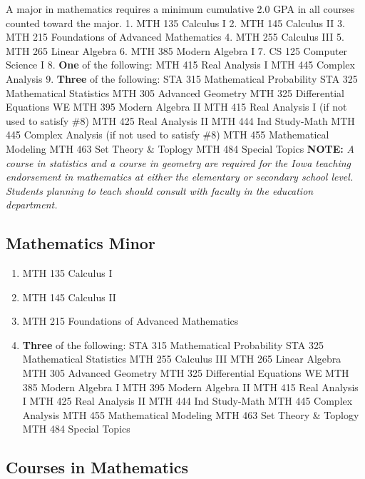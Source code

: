 \documentclass[
  letterpaper,
]{scrbook}
\providecommand{\tightlist}{%
  \setlength{\itemsep}{0pt}\setlength{\parskip}{0pt}}
\begin{document}
A major in mathematics requires a minimum cumulative 2.0 GPA in all
courses counted toward the major. 1. MTH 135 Calculus I 2. MTH 145
Calculus II 3. MTH 215 Foundations of Advanced Mathematics 4. MTH 255
Calculus III 5. MTH 265 Linear Algebra 6. MTH 385 Modern Algebra I 7. CS
125 Computer Science I 8. \textbf{One} of the following: MTH 415 Real
Analysis I MTH 445 Complex Analysis 9. \textbf{Three} of the following:
STA 315 Mathematical Probability STA 325 Mathematical Statistics MTH 305
Advanced Geometry MTH 325 Differential Equations WE MTH 395 Modern
Algebra II MTH 415 Real Analysis I (if not used to satisfy \#8) MTH 425
Real Analysis II MTH 444 Ind Study-Math MTH 445 Complex Analysis (if not
used to satisfy \#8) MTH 455 Mathematical Modeling MTH 463 Set Theory \&
Toplogy MTH 484 Special Topics \textbf{NOTE:} \emph{A course in
statistics and a course in geometry are required for the Iowa teaching
endorsement in mathematics at either the elementary or secondary school
level. Students planning to teach should consult with faculty in the
education department. }

\subsection{Mathematics Minor}\label{mathematics-minor}

\begin{enumerate}
\def\labelenumi{\arabic{enumi}.}
\tightlist
\item
  MTH 135 Calculus I
\item
  MTH 145 Calculus II
\item
  MTH 215 Foundations of Advanced Mathematics
\item
  \textbf{Three} of the following: STA 315 Mathematical Probability STA
  325 Mathematical Statistics MTH 255 Calculus III MTH 265 Linear
  Algebra MTH 305 Advanced Geometry MTH 325 Differential Equations WE
  MTH 385 Modern Algebra I MTH 395 Modern Algebra II MTH 415 Real
  Analysis I MTH 425 Real Analysis II MTH 444 Ind Study-Math MTH 445
  Complex Analysis MTH 455 Mathematical Modeling MTH 463 Set Theory \&
  Toplogy MTH 484 Special Topics
\end{enumerate}

\subsection{Courses in Mathematics}\label{courses-in-mathematics}
\end{document}
